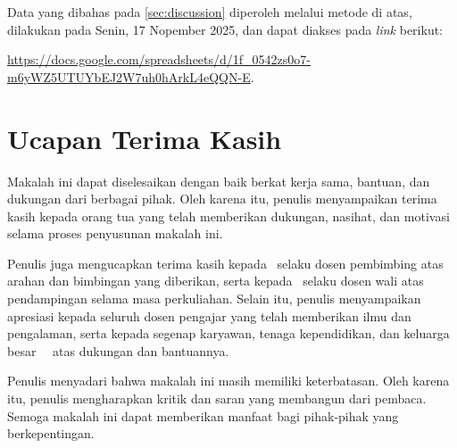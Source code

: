 \documentclass[10pt,twocolumn]{article}
\newcommand{\foreign}[1]{\foreignlanguage{english}{\textit{#1}}}
\begin{document}
Data yang dibahas pada \autoref{sec:discussion} diperoleh melalui metode di atas, dilakukan pada Senin, 17 Nopember 2025, dan dapat diakses pada \foreign{link} berikut:
\vspace{-.475\baselineskip}
\begin{center}
	\url{https://docs.google.com/spreadsheets/d/1f_0542zs0o7-m6yWZ5UTUYbEJ2W7uh0hArkL4eQQN-E}.
\end{center}

\section*{Ucapan Terima Kasih}

Makalah ini dapat diselesaikan dengan baik berkat kerja sama, bantuan, dan dukungan dari berbagai pihak. Oleh karena itu, penulis menyampaikan terima kasih kepada orang tua yang telah memberikan dukungan, nasihat, dan motivasi selama proses penyusunan makalah ini.

Penulis juga mengucapkan terima kasih kepada \supervisor\ selaku dosen pembimbing atas arahan dan bimbingan yang diberikan, serta kepada \academicAdvisor\ selaku dosen wali atas pendampingan selama masa perkuliahan. Selain itu, penulis menyampaikan apresiasi kepada seluruh dosen pengajar yang telah memberikan ilmu dan pengalaman, serta kepada segenap karyawan, tenaga kependidikan, dan keluarga besar \departmentNameBahasa\ \campusName\ atas dukungan dan bantuannya.

Penulis menyadari bahwa makalah ini masih memiliki keterbatasan. Oleh karena itu, penulis mengharapkan kritik dan saran yang membangun dari pembaca. Semoga makalah ini dapat memberikan manfaat bagi pihak-pihak yang berkepentingan.



\end{document}
